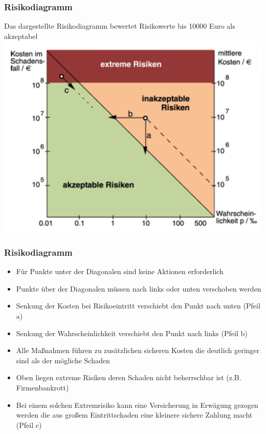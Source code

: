 \begin{frame}
\frametitle{Risikodiagramm}
	Das dargestellte Risikodiagramm bewertet Risikowerte bis 10000 Euro als akzeptabel
	\center\includegraphics[width=1\textwidth,
		keepaspectratio=true]{bilder/risikodiagramm.png}
\end{frame}

\begin{frame}
\frametitle{Risikodiagramm}
	\begin{itemize}
		\item Für Punkte unter der Diagonalen sind keine Aktionen erforderlich
		\item Punkte über der Diagonalen müssen nach links oder unten verschoben werden
		\item Senkung der Kosten bei Risikoeintritt verschiebt den Punkt nach unten (Pfeil a)
		\item Senkung der Wahrscheinlichkeit verschiebt den Punkt nach links (Pfeil b)
		\item Alle Maßnahmen führen zu zusätzlichen sicheren Kosten die deutlich geringer sind
					als der mögliche Schaden
		\item Oben liegen extreme Risiken deren Schaden nicht beherrschbar ist (z.B. Firmenbankrott)
		\item Bei einem solchen Extremrisiko kann eine Versicherung in Erwägung gezogen werden die aus
					großem Eintrittschaden eine kleinere sichere Zahlung macht (Pfeil c)
	\end{itemize}
\end{frame}

